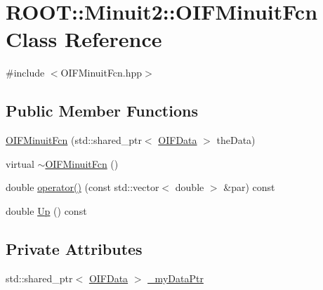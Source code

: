 \hypertarget{classROOT_1_1Minuit2_1_1OIFMinuitFcn}{
\section{ROOT::Minuit2::OIFMinuitFcn Class Reference}
\label{d3/dc7/classROOT_1_1Minuit2_1_1OIFMinuitFcn}
}


{\ttfamily \#include $<$OIFMinuitFcn.hpp$>$}

\subsection*{Public Member Functions}
\begin{DoxyCompactItemize}
\item 
\hyperlink{classROOT_1_1Minuit2_1_1OIFMinuitFcn_aff2f5645420e8719ebc6415b04184433}{OIFMinuitFcn} (std::shared\_\-ptr$<$ \hyperlink{classOIFData}{OIFData} $>$ theData)
\item 
virtual \hyperlink{classROOT_1_1Minuit2_1_1OIFMinuitFcn_a6f933e4568fc0d8ad5a6d3d6ad2fd727}{$\sim$OIFMinuitFcn} ()
\item 
double \hyperlink{classROOT_1_1Minuit2_1_1OIFMinuitFcn_a7e83033d923f085fa8192c8952027f39}{operator()} (const std::vector$<$ double $>$ \&par) const 
\item 
double \hyperlink{classROOT_1_1Minuit2_1_1OIFMinuitFcn_a6f55d1c39778acd5bbed8e04e6f049e4}{Up} () const 
\end{DoxyCompactItemize}
\subsection*{Private Attributes}
\begin{DoxyCompactItemize}
\item 
std::shared\_\-ptr$<$ \hyperlink{classOIFData}{OIFData} $>$ \hyperlink{classROOT_1_1Minuit2_1_1OIFMinuitFcn_a0fd03437f3d07ab064773733efb8e4bf}{\_\-myDataPtr}
\end{DoxyCompactItemize}


